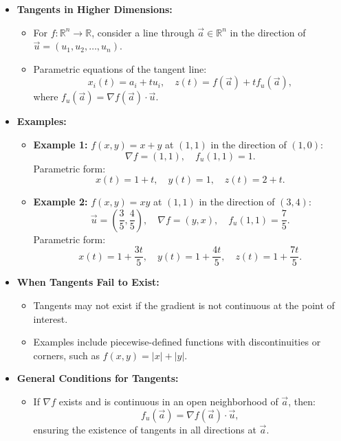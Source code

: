 \documentclass{article}
\begin{document}
\begin{itemize}
  \item \textbf{Tangents in Higher Dimensions:}
    \begin{itemize}
      \item For $f: \mathbb{R}^n \to \mathbb{R}$, consider a line through $\vec{a} \in \mathbb{R}^n$ in the direction of $\vec{u} = (u_1, u_2, \dots, u_n)$.
      \item Parametric equations of the tangent line:
        \[
          x_i(t) = a_i + t u_i, \quad z(t) = f(\vec{a}) + t f_u(\vec{a}),
        \]
        where $f_u(\vec{a}) = \nabla f(\vec{a}) \cdot \vec{u}$.
    \end{itemize}

  \item \textbf{Examples:}
    \begin{itemize}
      \item \textbf{Example 1:} $f(x, y) = x + y$ at $(1, 1)$ in the direction of $(1, 0)$:
        \[
          \nabla f = (1, 1), \quad f_u(1, 1) = 1.
        \]
        Parametric form:
        \[
          x(t) = 1 + t, \quad y(t) = 1, \quad z(t) = 2 + t.
        \]
      \item \textbf{Example 2:} $f(x, y) = xy$ at $(1, 1)$ in the direction of $(3, 4)$:
        \[
          \vec{u} = \left(\frac{3}{5}, \frac{4}{5}\right), \quad \nabla f = (y, x), \quad f_u(1, 1) = \frac{7}{5}.
        \]
        Parametric form:
        \[
          x(t) = 1 + \frac{3t}{5}, \quad y(t) = 1 + \frac{4t}{5}, \quad z(t) = 1 + \frac{7t}{5}.
        \]
    \end{itemize}

  \item \textbf{When Tangents Fail to Exist:}
    \begin{itemize}
      \item Tangents may not exist if the gradient is not continuous at the point of interest.
      \item Examples include piecewise-defined functions with discontinuities or corners, such as $f(x, y) = |x| + |y|$.
    \end{itemize}

  \item \textbf{General Conditions for Tangents:}
    \begin{itemize}
      \item If $\nabla f$ exists and is continuous in an open neighborhood of $\vec{a}$, then:
        \[
          f_u(\vec{a}) = \nabla f(\vec{a}) \cdot \vec{u},
        \]
        ensuring the existence of tangents in all directions at $\vec{a}$.
    \end{itemize}
\end{itemize}
\end{document}
